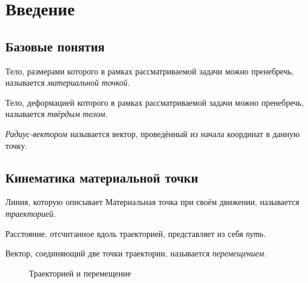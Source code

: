 \section{Введение}

\subsection{Базовые понятия}

\begin{definition}
    Тело, размерами которого в рамках рассматриваемой задачи можно пренебречь, называется \textit{материальной точкой}.
\end{definition}

\begin{definition}
    Тело, деформацией которого в рамках рассматриваемой задачи можно пренебречь, называется \textit{твёрдым телом}.
\end{definition}

\begin{definition}
    \textit{Радиус-вектором} называется вектор, проведённый из начала координат в данную точку.
\end{definition}

\subsection{Кинематика материальной точки}

\begin{definition}[Траектория]
    Линия, которую описывает Материальная точка при своём движении, называется \textit{траекторией}.
\end{definition}

\begin{definition}[Путь]
    Расстояние, отсчитанное вдоль траекторией, представляет из себя \textit{путь}. 
\end{definition}

\begin{definition}[Перемещение]
    Вектор, соединяющий две точки траектории, называется \textit{перемещением}. 
\end{definition}

\begin{figure}[ht]
    \centering
    \caption{Траекторией и перемещение}
\end{figure}

